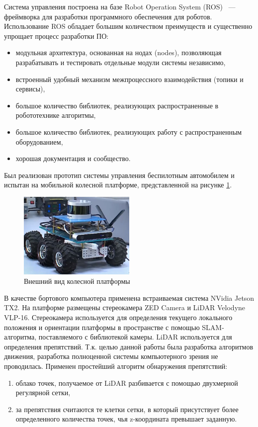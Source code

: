 Система управления построена на базе Robot Operation System (ROS) ~--- фреймворка для разработки
программного обеспечения для роботов. Использование ROS обладает большим количеством преимуществ
и существенно упрощает процесс разработки ПО:
\begin{itemize}
    \item модульная архитектура, основанная на нодах (nodes), позволяющая разрабатывать
          и тестировать отдельные модули системы независимо,
    \item встроенный удобный механизм межпроцессного взаимодействия (топики и сервисы),
    \item большое количество библиотек, реализующих распространенные в робототехнике алгоритмы,
    \item большое количество библиотек, реализующих работу с распространенным оборудованием,
    \item хорошая документация и сообщество.
\end{itemize}

Был реализован прототип системы управления беспилотным автомобилем и испытан на мобильной
колесной платформе, представленной на рисунке \ref{img:car}.

\begin{figure}[h]
    \centering
    \includegraphics[width=0.5\textwidth]{images/car}
    \caption{Внешний вид колесной платформы}
    \label{img:car}
\end{figure}

В качестве бортового компьютера применена встраиваемая система NVidia Jetson TX2. На платформе размещены
стереокамера ZED Camera и LiDAR Velodyne VLP-16. Стереокамера используется для определения текущего локального
положения и ориентации платформы в пространстве с помощью SLAM-алгоритма, поставляемого с библиотекой
камеры. LiDAR используется для определения препятствий. Т.к. целью данной работы была разработка алгоритмов
движения, разработка полноценной системы компьютерного зрения не проводилась. Применен простейший алгоритм
обнаружения препятствий:
\begin{enumerate}
    \item облако точек, получаемое от LiDAR разбивается с помощью двухмерной регулярной сетки,
    \item за препятствия считаются те клетки сетки, в который присутствует более определенного
          количества точек, чья z-координата превышает заданную.
\end{enumerate}


